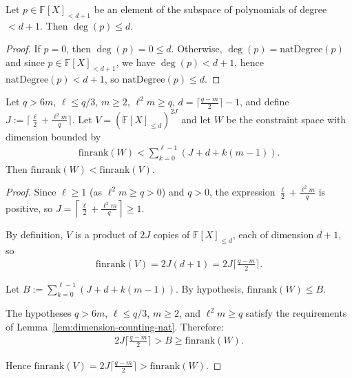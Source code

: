 \begin{lemma}\label{lem:natDegree-le-of-mem-degreeLT-succ} \leanok {}
  Let $p \in \mathbb{F}[X]_{<d+1}$ be an element of the subspace of polynomials of degree $< d+1$. Then $\deg(p) \leq d$.
\end{lemma}
\begin{proof} \leanok
  If $p = 0$, then $\deg(p) = 0 \leq d$. Otherwise, $\deg(p) = \mathrm{natDegree}(p)$ and since $p \in \mathbb{F}[X]_{<d+1}$, we have $\deg(p) < d+1$, hence $\mathrm{natDegree}(p) < d+1$, so $\mathrm{natDegree}(p) \leq d$.
\end{proof}

\begin{lemma}\label{lem:stepanov-dimension-inequality-ceil} \leanok {}
  Let $q > 6m$, $\ell \leq q/3$, $m \geq 2$, $\ell^2 m \geq q$, $d = \lceil\frac{q-m}{2}\rceil - 1$, and define $J := \lceil\frac{\ell}{2} + \frac{\ell^2 m}{q}\rceil$. Let $V = (\mathbb{F}[X]_{\leq d})^{2J}$ and let $W$ be the constraint space with dimension bounded by
  \begin{align*}
    \mathrm{finrank}(W) < \sum_{k=0}^{\ell-1} (J + d + k(m-1)).
  \end{align*}
  Then $\mathrm{finrank}(W) < \mathrm{finrank}(V)$.
\end{lemma}
\begin{proof} \leanok
  Since $\ell \geq 1$ (as $\ell^2 m \geq q > 0$) and $q > 0$, the expression $\frac{\ell}{2} + \frac{\ell^2 m}{q}$ is positive, so $J = \left\lceil \frac{\ell}{2} + \frac{\ell^2 m}{q} \right\rceil \geq 1$.

  By definition, $V$ is a product of $2J$ copies of $\mathbb{F}[X]_{\leq d}$, each of dimension $d+1$, so
  \begin{align*}
    \mathrm{finrank}(V) = 2J(d+1) = 2J\lceil\tfrac{q-m}{2}\rceil.
  \end{align*}

  Let $B := \sum_{k=0}^{\ell-1}(J + d + k(m-1))$. By hypothesis, $\mathrm{finrank}(W) \leq B$.

  The hypotheses $q > 6m$, $\ell \leq q/3$, $m \geq 2$, and $\ell^2 m \geq q$ satisfy the requirements of Lemma~\ref{lem:dimension-counting-nat}. Therefore:
  \begin{align*}
    2J\lceil\tfrac{q-m}{2}\rceil > B \geq \mathrm{finrank}(W).
  \end{align*}

  Hence $\mathrm{finrank}(V) = 2J\lceil\tfrac{q-m}{2}\rceil > \mathrm{finrank}(W)$.
\end{proof}

